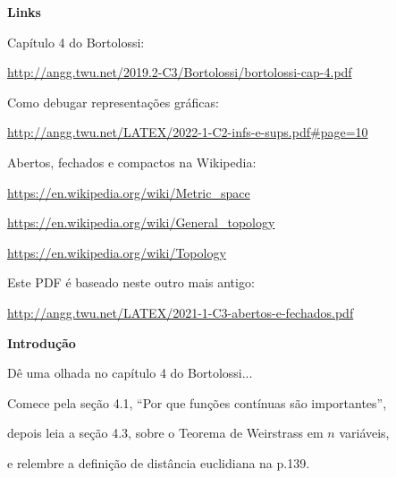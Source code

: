 \documentclass[oneside,12pt]{article}
\begin{document}
{\bf Links}

Capítulo 4 do Bortolossi:

{\footnotesize

\url{http://angg.twu.net/2019.2-C3/Bortolossi/bortolossi-cap-4.pdf}

}

\ssk

Como debugar representações gráficas:

{\footnotesize

\url{http://angg.twu.net/LATEX/2022-1-C2-infs-e-sups.pdf#page=10}

}

\ssk

Abertos, fechados e compactos na Wikipedia:

{\footnotesize

\url{https://en.wikipedia.org/wiki/Metric_space}

\url{https://en.wikipedia.org/wiki/General_topology}

\url{https://en.wikipedia.org/wiki/Topology}

}


\ssk

Este PDF é baseado neste outro mais antigo:

{\footnotesize

\url{http://angg.twu.net/LATEX/2021-1-C3-abertos-e-fechados.pdf}

}

\ssk





\newpage

{\bf Introdução}

Dê uma olhada no capítulo 4 do Bortolossi...

Comece pela seção 4.1, ``Por que funções contínuas são importantes'',

depois leia a seção 4.3, sobre o Teorema de Weirstrass em $n$ variáveis,

e relembre a definição de distância euclidiana na p.139.

\msk
\end{document}
